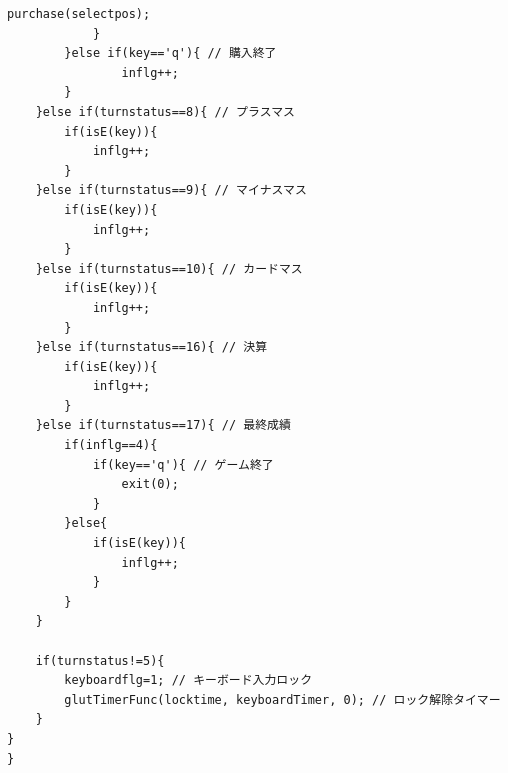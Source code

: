 \documentclass[a4j]{jarticle}
\begin{document}
\begin{lstlisting}[basicstyle=\ttfamily\footnotesize, frame=single,label=code2,caption=game.c]
                purchase(selectpos);
            }
        }else if(key=='q'){ // 購入終了
                inflg++;
        }
    }else if(turnstatus==8){ // プラスマス
        if(isE(key)){
            inflg++;
        }        
    }else if(turnstatus==9){ // マイナスマス
        if(isE(key)){
            inflg++;
        }        
    }else if(turnstatus==10){ // カードマス
        if(isE(key)){
            inflg++;
        }        
    }else if(turnstatus==16){ // 決算
        if(isE(key)){
            inflg++;
        }        
    }else if(turnstatus==17){ // 最終成績
        if(inflg==4){
            if(key=='q'){ // ゲーム終了
                exit(0);
            }
        }else{
            if(isE(key)){
                inflg++;
            }
        }        
    }

    if(turnstatus!=5){
        keyboardflg=1; // キーボード入力ロック
        glutTimerFunc(locktime, keyboardTimer, 0); // ロック解除タイマー
    }
}
}


\end{lstlisting}
\end{document}
